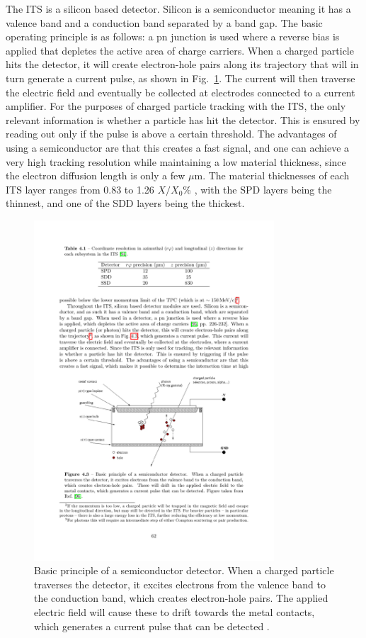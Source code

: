 The ITS is a silicon based detector. Silicon is a semiconductor meaning it has a valence band and a conduction band separated by a band gap. The basic operating principle is as follows: a pn junction is used where a reverse bias is applied that depletes the active area of charge carriers. When a charged particle hits the detector, it will create electron-hole pairs along its trajectory that will in turn generate a current pulse, as shown in Fig.~\ref{fig:silicon}. The current will then traverse the electric field and eventually be collected at electrodes connected to a current amplifier. For the purposes of charged particle tracking with the ITS, the only relevant information is whether a particle has hit the detector. This is ensured by reading out only if the pulse is above a certain threshold. The advantages of using a semiconductor are that this creates a fast signal, and one can achieve a very high tracking resolution while maintaining a low material thickness, since the electron diffusion length is only a few $\mu$m. The material thicknesses of each ITS layer ranges from 0.83 to 1.26 $X/X_0$\% \cite{Contin_2012}, with the SPD layers being the thinnest, and one of the SDD layers being the thickest.

\begin{figure}[htpb]
  \centering
  \includegraphics[width=0.8\textwidth]{Experimental_Aparatus/silicon_detector.pdf}
  \caption{Basic principle of a semiconductor detector. When a charged particle traverses the detector, it excites electrons from the valence band to the conduction band, which creates electron-hole pairs. The applied electric field will cause these to drift towards the metal contacts, which generates a current pulse that can be detected \cite{Brenner}.}
  \label{fig:silicon}
\end{figure}

